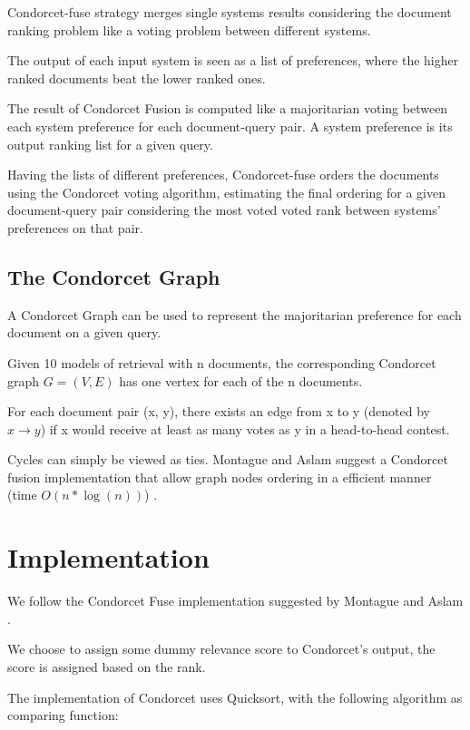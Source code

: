 Condorcet-fuse strategy merges single systems results considering the document ranking problem like a voting problem between different systems. 


The output of each input system is seen as a list of preferences, where the higher ranked documents beat the lower ranked ones.

The result of Condorcet Fusion is computed like a majoritarian voting between each system preference for each document-query pair. 
A system preference is its output ranking list for a given query.  


Having the lists of different preferences, Condorcet-fuse orders the documents using the Condorcet voting algorithm, estimating the final ordering for a given document-query pair considering the most voted 
voted rank between systems' preferences on that pair. 


\subsection{The Condorcet Graph}

A Condorcet Graph can be used to represent the majoritarian preference for each document on a given query. 

Given 10 models of retrieval with n documents, the corresponding
Condorcet graph $G = (V, E)$ has one vertex for each of the n documents.

For each document pair (x, y), there exists an edge from x to
y (denoted by $x \rightarrow y$) if x would receive at least as many votes as y in a head-to-head contest.

Cycles can simply be viewed as ties.
Montague and Aslam \cite{3} suggest a Condorcet fusion implementation that allow graph nodes ordering in a efficient manner (time $O(n*\log(n))$) .  

\section{Implementation}

We follow the Condorcet Fuse implementation suggested by Montague and Aslam \cite{3}.

We choose to assign some dummy relevance score to Condorcet's output, the score is assigned based on the rank.

The implementation of Condorcet uses Quicksort, with the following algorithm
as comparing function:


